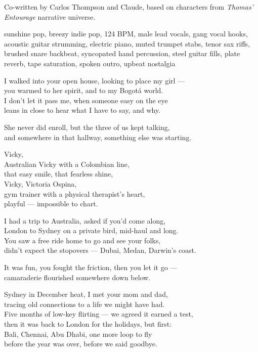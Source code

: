 
\begin{notes}
Co-written by Carlos Thompson and Claude, based on characters from \emph{Thomas’ Entourage} narrative universe.
\end{notes}
\begin{style}
sunshine pop, breezy indie pop, 124 BPM, male lead vocals, gang vocal hooks, acoustic guitar strumming, electric piano, muted trumpet stabs, tenor sax riffs, brushed snare backbeat, syncopated hand percussion, steel guitar fills, plate reverb, tape saturation, spoken outro, upbeat nostalgia
\end{style}
\begin{lyrics}
I walked into your open house, looking to place my girl —\\
you warmed to her spirit, and to my Bogotá world.\\
I don't let it pass me, when someone easy on the eye\\
leans in close to hear what I have to say, and why.

She never did enroll, but the three of us kept talking,\\
and somewhere in that hallway, something else was starting.

Vicky,\\
Australian Vicky with a Colombian line,\\
that easy smile, that fearless shine,\\
Vicky, Victoria Ospina,\\
gym trainer with a physical therapist's heart,\\
playful — impossible to chart.

I had a trip to Australia, asked if you'd come along,\\
London to Sydney on a private bird, mid-haul and long.\\
You saw a free ride home to go and see your folks,\\
didn't expect the stopovers — Dubai, Medan, Darwin's coast.

It was fun, you fought the friction, then you let it go —\\
camaraderie flourished somewhere down below.


Sydney in December heat, I met your mom and dad,\\
tracing old connections to a life we might have had.\\
Five months of low-key flirting — we agreed it earned a test,\\
then it was back to London for the holidays, but first:\\
Bali, Chennai, Abu Dhabi, one more loop to fly\\
before the year was over, before we said goodbye.


\end{lyrics}
